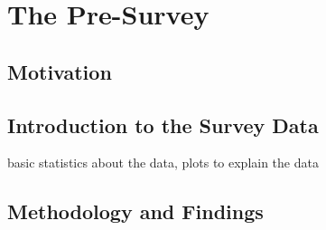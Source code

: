 
\chapter{The Pre-Survey}

\section{Motivation}

\section{Introduction to the Survey Data}
basic statistics about the data, plots to explain the data

\section{Methodology and Findings}



